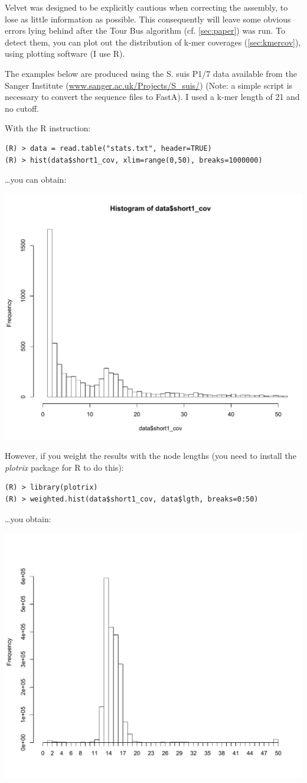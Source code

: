 \documentclass{article}
\begin{document}
Velvet was designed to be explicitly cautious when correcting the assembly, to lose as little information as possible. This consequently will leave some obvious errors lying behind after the Tour Bus algorithm (cf. \ref{sec:paper}) was run. To detect them, you can plot out the distribution of k-mer coverages (\ref{sec:kmercov}), using plotting software (I use R).

The examples below are produced using the S. suis P1/7 data available from the Sanger Institute (\href{http://www.sanger.ac.uk/Projects/S_suis/}{www.sanger.ac.uk/Projects/S\_suis/}) (Note: a simple script is necessary to convert the sequence files to FastA).  I used a k-mer length of 21 and no cutoff. 

With the R instruction:
\begin{verbatim}
(R) > data = read.table("stats.txt", header=TRUE)
(R) > hist(data$short1_cov, xlim=range(0,50), breaks=1000000)
\end{verbatim}
\ldots you can obtain:

\includegraphics[keepaspectratio=true,width=300bp]{./Suis_plot_1.pdf}

However, if you weight the results with the node lengths (you need to install the \emph{plotrix} package for R to do this):
\begin{verbatim}
(R) > library(plotrix)
(R) > weighted.hist(data$short1_cov, data$lgth, breaks=0:50)
\end{verbatim}
\ldots you obtain:

\includegraphics[keepaspectratio=true,width=300bp]{./suis_plot.pdf}
\end{document}
